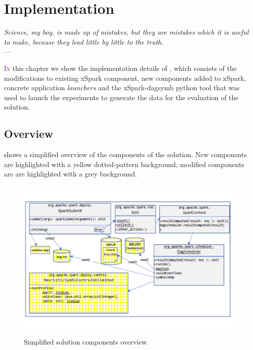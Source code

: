 \chapter{Implementation} \label{chap:implementation}
\begin{flushright}{\slshape    
   Science, my boy, is made up of mistakes, but they are mistakes
   which it is useful to make, because they lead little by little
   to the truth}. \\ \medskip --- \citeauthor{verne_journey:1957}
    \citeyear{verne_journey:1957}
\end{flushright} 

\lettrine[lines=4]{\textcolor{purple}{I}}{n} this chapter we show the implementation details of \tool, which consists of the modifications to existing xSpark component, new components added to xSpark, \textit\approach\xspace concrete application \textit {launchers} and the {xSpark-dagsymb} python tool that was used to launch the experiments to generate the data for the evaluation of the solution.


\section{Overview}\label{sec:impl_overview}
 shows a simplified overview of the components of the solution. New components are highlighted with a yellow dotted-pattern background, modified components are are highlighted with a grey background.
\begin{figure}[tbhp]
	\centering
	\includegraphics[width=12cm]{images/solution_impl_overview}
	\caption{Simplified solution components overview.}
	\label{fig:solution_impl_overview}
\end{figure}


